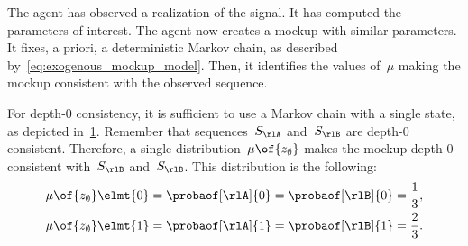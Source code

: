 \begin{example}
The agent has observed a realization of the signal.
It has computed the parameters of interest.
The agent now creates a mockup with similar parameters.
It fixes, a priori, a deterministic Markov chain, as described by~\cref{eq:exogenous_mockup_model}.
Then, it identifies the values of~\(\mu\) making the mockup consistent with the observed sequence.

For depth-\(0\) consistency, it is sufficient to use a Markov chain with a single state, as depicted in~\cref{fig:consistency_one-state_markov_chain}.
Remember that sequences~\(S\param{\rlA}\) and~\(S\param{\rlB}\) are depth-\(0\) consistent.
Therefore, a single distribution~\(\mu \of{z\param{\emptyset}}\) makes the mockup depth-\(0\) consistent with~\(S\param{\rlB}\) and~\(S\param{\rlB}\).
This distribution is the following:
\[
\begin{aligned}
&\mu \of{z\param{\emptyset}} \elmt{0} = \probaof[\rlA]{0} = \probaof[\rlB]{0} = \frac{1}{3}, \\
&\mu \of{z\param{\emptyset}} \elmt{1} = \probaof[\rlA]{1} = \probaof[\rlB]{1} = \frac{2}{3}.
\end{aligned}
\]

\begin{figure}[htp]
\centering
{}
\label{fig:consistency_one-state_markov_chain}
\end{figure}



\end{example}
